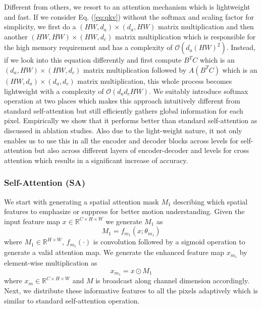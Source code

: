 \documentclass[10pt,twocolumn,letterpaper]{article}
\begin{document}
\par Different from others, we resort to an attention mechanism which is lightweight and fast. If we consider Eq. (\ref{eq:qkv}) without the softmax and scaling factor for simplicity, we first do a $(HW,d_a) \times (d_a,HW)$ matrix multiplication and then another $(HW,HW) \times (HW,d_c)$ matrix multiplication which is responsible for the high memory requirement and has a complexity of $\mathcal{O}(d_a(HW)^2)$. Instead, if we look into this equation differently and first compute $B^TC$ which is an $(d_a,HW) \times (HW,d_c)$ matrix multiplication followed by $A(B^TC)$ which is an $(HW,d_a) \times (d_a,d_c)$ matrix multiplication, this whole process becomes lightweight with a complexity of $\mathcal{O}(d_ad_cHW)$. We suitably introduce softmax operation at two places which makes this approach intuitively different from standard self-attention but still efficiently gathers global information for each pixel. Empirically we show that it performs better than standard self-attention as discussed in ablation studies. Also due to the light-weight nature, it not only enables us to use this in all the encoder and decoder blocks across levels for self-attention but also across different layers of encoder-decoder and levels for cross attention which results in a significant increase of accuracy. 
\subsubsection{Self-Attention (SA)}
We start with generating a spatial attention mask $M_1$ describing which spatial features to emphasize or suppress for better motion understanding. Given the input feature map $x\in\mathbb{R}^{C \times H \times W}$ we generate $M_1$ as
\begin{equation}
    M_1 = f_{m_1}(x;\theta_{m_1})
\end{equation}
where $M_1 \in \mathbb{R}^{H \times W}$, $f_{m_1}(\cdot)$ is convolution followed by a sigmoid operation to generate a valid attention map. We generate the enhanced feature map $x_{m_1}$ by element-wise multiplication as
\begin{equation}\label{eq:sa1}
    x_{m_1} = x \odot M_1
\end{equation}
where $x_m \in \mathbb{R}^{C \times H \times W}$ and $M$ is broadcast along channel dimension accordingly. Next, we distribute these informative features to all the pixels adaptively which is similar to standard self-attention operation.
\end{document}
